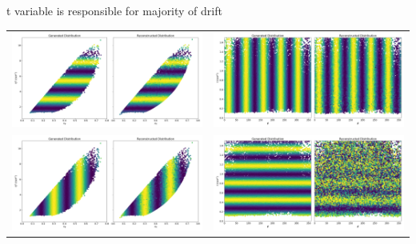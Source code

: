 \documentclass[aspectratio=169]{beamer}
\begin{document}
\begin{frame}{t variable is responsible for majority of drift}

     \begin{center}
            \begin{tabular}{cc}
                \includegraphics[width=0.345\linewidth]{Main/ibu/waving/sine_plots_Q2.png} & 
                \includegraphics[width=0.345\linewidth]{Main/ibu/waving/sine_plots_phi.png} \\
                \includegraphics[width=0.345\linewidth]{Main/ibu/waving/sine_plots_xB.png} & 
                \includegraphics[width=0.345\linewidth]{Main/ibu/waving/sine_plots_t.png} \\
            \end{tabular}
        \end{center}
\end{frame}
\end{document}
